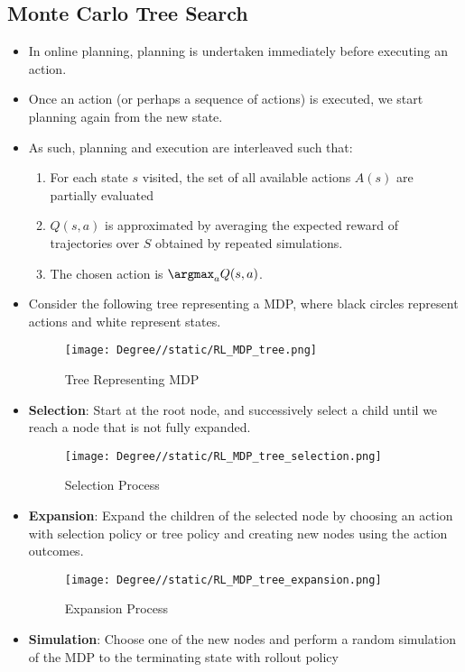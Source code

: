 \documentclass[a4paper]{article}
\begin{document}
\subsection{Monte Carlo Tree Search}
\begin{itemize}
    \item In online planning, planning is undertaken immediately before executing an action. 
    \item Once an action (or perhaps a sequence of actions) is executed, we start planning again from the new state. 
    \item As such, planning and execution are interleaved such that:
    \begin{enumerate}
        \item For each state $s$ visited, the set of all available actions $A(s)$ are partially evaluated
        \item $Q(s,a)$ is approximated by averaging the expected reward of trajectories over $S$ obtained by repeated simulations.
        \item The chosen action is $\argmax_a Q(s,a)$.
    \end{enumerate}
    \item Consider the following tree representing a MDP, where black circles represent actions and white represent states.
    \begin{figure}[H]
        \centering
        \texttt{[image: Degree//static/RL\_MDP\_tree.png]}
        \caption{Tree Representing MDP}
    \end{figure}
    \item \textbf{Selection}: Start at the root node, and successively select a child until we reach a node that is not fully expanded.
    \begin{figure}[H]
        \centering
        \texttt{[image: Degree//static/RL\_MDP\_tree\_selection.png]}
        \caption{Selection Process}
    \end{figure}
    \item \textbf{Expansion}: Expand the children of the selected node by choosing an action with selection policy or tree policy and creating new nodes using the action outcomes.
    \begin{figure}[H]
        \centering
        \texttt{[image: Degree//static/RL\_MDP\_tree\_expansion.png]}
        \caption{Expansion Process}
    \end{figure}
    \item \textbf{Simulation}: Choose one of the new nodes and perform a random simulation of the MDP to the terminating state with rollout policy

\end{itemize}
\end{document}
